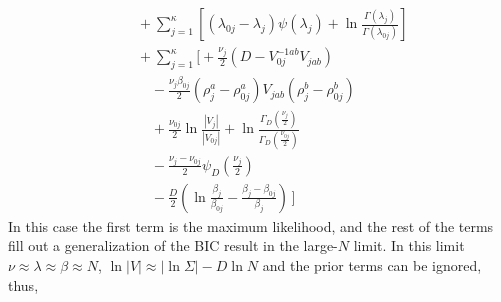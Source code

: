 \documentclass[aps,showpacs,twocolumn,prd,superscriptaddress,nofootinbib]{revtex4}
\newcommand{\nn}{\nonumber}
\newcommand{\E}[1]{{\mathbb E}_{#1}\!}
\begin{document}
\begin{align}
    &\quad+\sum_{j=1}^\kappa\left[\left(\lambda_{0j}-\lambda_j\right)\psi(\lambda_j)+\ln\frac{\Gamma(\lambda_j)}{\Gamma(\lambda_{0j})}\right]\nn\\
    &\quad+\sum_{j=1}^\kappa\Big[
      +\frac{\nu_j}2\left(D-V_{0j}^{-1ab}V_{jab}\right)\nn\\
      &\qquad-\frac{\nu_j\beta_{0j}}2\left(\rho_j^a-\rho_{0j}^a\right)V_{jab}(\rho_j^b-\rho_{0j}^b)\nn\\
      &\qquad+\frac{\nu_{0j}}2\ln\frac{|V_j|}{|V_{0j}|}+\ln\frac{\Gamma_D\left(\frac{\nu_j}2\right)}{\Gamma_D\left(\frac{\nu_{0j}}2\right)}\nn\\
      &\qquad-\frac{\nu_j-\nu_{0j}}2\psi_D\left(\frac{\nu_j}2\right)\nn\\
      &\qquad-\frac D2\left(\ln\frac{\beta_j}{\beta_{0j}}
      -\frac{\beta_j-\beta_{0j}}{\beta_j}\right)\,\Big]
\end{align}
In this case the first term is the maximum likelihood, and the rest of the terms fill out a generalization of the BIC result in the large-$N$ limit.  In this limit $\nu\approx\lambda\approx\beta\approx N$, $\ln|V|\approx|\ln\Sigma|-D\ln N$ and the prior terms can be ignored, thus,
\end{document}
